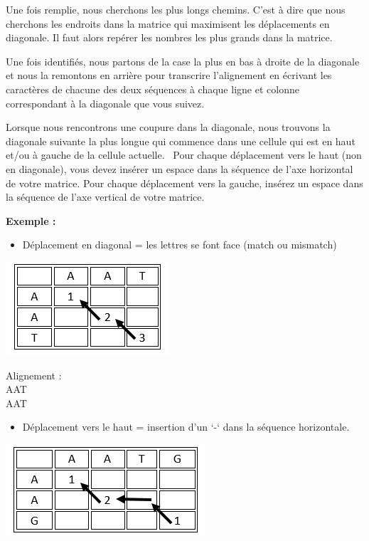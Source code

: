 \documentclass{article}
\begin{document}
Une fois remplie, nous cherchons les plus longs chemins. C’est à dire que nous cherchons les endroits dans la matrice qui maximisent les déplacements en diagonale. Il faut alors repérer les nombres les plus grands dans la matrice.

Une fois identifiés, nous partons de la case la plus en bas à droite de la diagonale et nous la remontons en arrière pour transcrire l'alignement en écrivant les caractères de chacune des deux séquences à chaque ligne et colonne correspondant à la diagonale que vous suivez.

Lorsque nous rencontrons une coupure dans la diagonale, nous trouvons la diagonale suivante la plus longue qui commence dans une cellule qui est en haut et/ou à gauche de la cellule actuelle.
\ 
Pour chaque déplacement vers le haut (non en diagonale), vous devez insérer un espace dans la séquence de l'axe horizontal de votre matrice. Pour chaque déplacement vers la gauche, insérez un espace dans la séquence de l'axe vertical de votre matrice.

\vfill
	\textbf{Exemple :}
    \begin{itemize}
    \item Déplacement en diagonal = les lettres se font face (match ou mismatch)
    \end{itemize}
\begin{center}
\includegraphics[]{figures/match.png}
\end{center}

Alignement :\\
AAT\\
AAT

\begin{itemize}
 \medbreak
\item Déplacement vers le haut = insertion d’un ‘-‘ dans la séquence horizontale.
\end{itemize}
\begin{center}
\includegraphics[]{figures/dep_haut.png}
\end{center}
\end{document}
